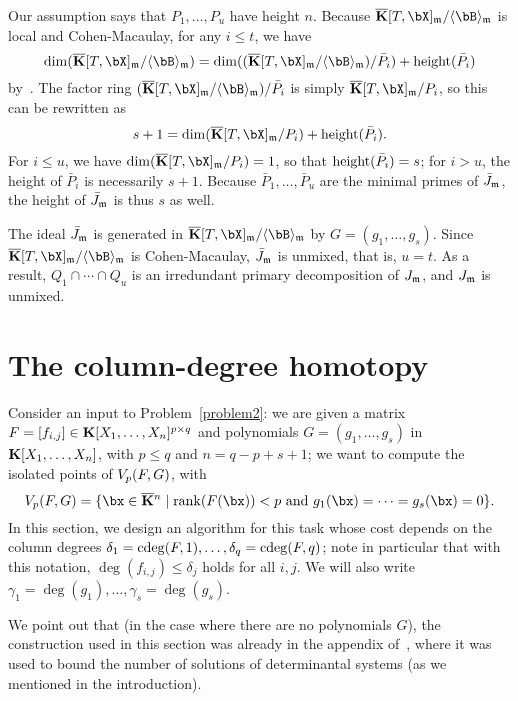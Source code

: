 \documentclass[12pt]{article}
\begin{document}
Our assumption says that $P_1,\dots,P_u$ have height $n$. Because
$\KKbar[T,\bX]_\m/\langle \bB \rangle_\m$ is local and Cohen-Macaulay, for any
$i \le t$, we have 
$$\dim(\KKbar[T,\bX]_\m/\langle \bB \rangle_\m)=\dim((\KKbar[T,\bX]_\m/\langle \bB \rangle_\m) / \bar P_i) + {\rm height}(\bar P_i)$$
by~\cite[Theorem~17.4(i)]{Matsumura86}.
The factor ring $(\KKbar[T,\bX]_\m/\langle \bB \rangle_\m) / \bar P_i$ is simply
$\KKbar[T,\bX]_\m/P_i$, so this can be rewritten as
$$s+1 = \dim(\KKbar[T,\bX]_\m/P_i) + {\rm height}(\bar P_i).$$ For $i\le
u$, we have $\dim(\KKbar[T,\bX]_\m/P_i)=1$, so that ${\rm height}(\bar
P_i)=s$; for $i > u$, the height of $\bar P_i$ is necessarily
$s+1$. Because $\bar P_1,\dots,\bar P_u$ are the minimal primes of
$\bar J_{\mathfrak{m}}$, the height of $\bar J_{\mathfrak{m}}$ is thus $s$ as well.

The ideal $\bar J_{\mathfrak{m}}$ is generated in $\KKbar[T,\bX]_\m/\langle \bB
\rangle_\m$ by $G=(g_1,\dots,g_s)$. Since $\KKbar[T,\bX]_\m/\langle
\bB \rangle_\m$ is Cohen-Macaulay, $\bar J_{\mathfrak{m}}$ is unmixed, that is,
$u=t$.  As a result, $Q_1 \cap \cdots \cap Q_u$ is an irredundant
primary decomposition of $J_{\mathfrak{m}}$, and $J_{\mathfrak{m}}$ is unmixed.


\section{The column-degree homotopy}\label{sec:columndegree}

Consider an input to Problem~\ref{problem2}: we are given a matrix
${F} =[f_{i,j}]\in \mathbf{K}[X_1,\dots,X_n]^{p \times q}$ and polynomials
$G=(g_1,\dots,g_s)$ in $\mathbf{K}[X_1,\dots,X_n]$, with $p \leq q$ and $n =
q-p+s+1$; we want to compute the isolated points of $V_{p}({F},G)$,
with
$$\VpFG{p}{\mF}{G} = \{\bx \in \KKbar{}^n \mid  \mathrm{rank}(\mF({\bx})) < p
\text{~and~} g_1(\bx)=\cdots=g_s(\bx)=0\}.$$
In this section, we design an algorithm for this task whose cost
depends on the column degrees
$\delta_1=\mathrm{cdeg}({F},1),\dots,\delta_q=\mathrm{cdeg}({F},q)$; note in
particular that with this notation, $\deg(f_{i,j}) \leq \delta_j$
holds for all $i,j$.  We will also write
$\gamma_1=\deg(g_1),\dots,\gamma_s=\deg(g_s)$.

We point out that (in the case where there are no polynomials $G$),
the construction used in this section was already in the appendix
of~\cite{NieRan09}, where it was used to bound the number of solutions
of determinantal systems (as we mentioned in the introduction).
\end{document}

